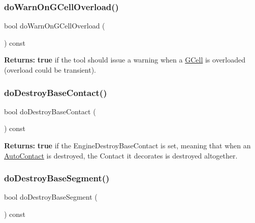\subsubsection{\texorpdfstring{do\+Warn\+On\+G\+Cell\+Overload()}{doWarnOnGCellOverload()}}
{\footnotesize\ttfamily bool do\+Warn\+On\+G\+Cell\+Overload (\begin{DoxyParamCaption}{ }\end{DoxyParamCaption}) const\hspace{0.3cm}{\ttfamily [inline]}}

{\bfseries Returns\+:} {\bfseries true} if the tool should issue a warning when a \hyperlink{classKatabatic_1_1GCell}{G\+Cell} is overloaded (overload could be transient). \mbox{\label{classKatabatic_1_1KatabaticEngine_a6bb0ac3c0ec9720a3519d43491939f97}} 
\subsubsection{\texorpdfstring{do\+Destroy\+Base\+Contact()}{doDestroyBaseContact()}}
{\footnotesize\ttfamily bool do\+Destroy\+Base\+Contact (\begin{DoxyParamCaption}{ }\end{DoxyParamCaption}) const\hspace{0.3cm}{\ttfamily [inline]}}

{\bfseries Returns\+:} {\bfseries true} if the Engine\+Destroy\+Base\+Contact is set, meaning that when an \hyperlink{classKatabatic_1_1AutoContact}{Auto\+Contact} is destroyed, the Contact it decorates is destroyed altogether. \mbox{\label{classKatabatic_1_1KatabaticEngine_a54d58d645317d43371f6b0bec1815e6b}} 
\subsubsection{\texorpdfstring{do\+Destroy\+Base\+Segment()}{doDestroyBaseSegment()}}
{\footnotesize\ttfamily bool do\+Destroy\+Base\+Segment (\begin{DoxyParamCaption}{ }\end{DoxyParamCaption}) const\hspace{0.3cm}{\ttfamily [inline]}}

